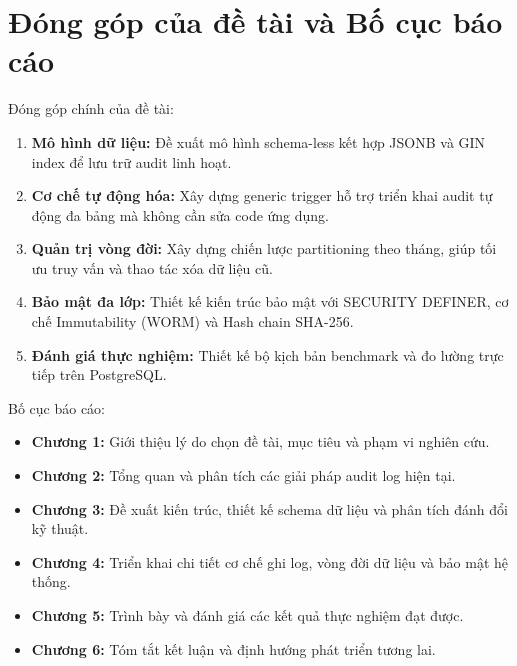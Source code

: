 \newpage
\section{Đóng góp của đề tài và Bố cục báo cáo}

Đóng góp chính của đề tài:
\begin{enumerate}
    \item \textbf{Mô hình dữ liệu:} Đề xuất mô hình schema-less kết hợp JSONB và GIN index để lưu trữ audit linh hoạt.
    \item \textbf{Cơ chế tự động hóa:} Xây dựng generic trigger hỗ trợ triển khai audit tự động đa bảng mà không cần sửa code ứng dụng.
    \item \textbf{Quản trị vòng đời:} Xây dựng chiến lược partitioning theo tháng, giúp tối ưu truy vấn và thao tác xóa dữ liệu cũ.
    \item \textbf{Bảo mật đa lớp:} Thiết kế kiến trúc bảo mật với SECURITY DEFINER, cơ chế Immutability (WORM) và Hash chain SHA-256.
    \item \textbf{Đánh giá thực nghiệm:} Thiết kế bộ kịch bản benchmark và đo lường trực tiếp trên PostgreSQL.
\end{enumerate}

Bố cục báo cáo:
\begin{itemize}
    \item \textbf{Chương 1:} Giới thiệu lý do chọn đề tài, mục tiêu và phạm vi nghiên cứu.
    \item \textbf{Chương 2:} Tổng quan và phân tích các giải pháp audit log hiện tại.
    \item \textbf{Chương 3:} Đề xuất kiến trúc, thiết kế schema dữ liệu và phân tích đánh đổi kỹ thuật.
    \item \textbf{Chương 4:} Triển khai chi tiết cơ chế ghi log, vòng đời dữ liệu và bảo mật hệ thống.
    \item \textbf{Chương 5:} Trình bày và đánh giá các kết quả thực nghiệm đạt được.
    \item \textbf{Chương 6:} Tóm tắt kết luận và định hướng phát triển tương lai.
\end{itemize}
